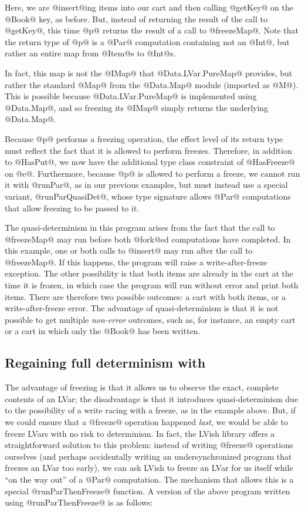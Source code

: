 Here, we are @insert@ing items into our cart and then calling @getKey@
on the @Book@ key, as before.  But, instead of returning the result of
the call to @getKey@, this time @p@ returns the result of a call to
@freezeMap@.  Note that the return type of @p@ is a @Par@ computation
containing not an @Int@, but rather an entire map from @Item@s to
@Int@s.

In fact, this map is not the @IMap@ that @Data.LVar.PureMap@ provides,
but rather the standard @Map@ from the @Data.Map@ module (imported as
@M@).  This is possible because @Data.LVar.PureMap@ is implemented
using @Data.Map@, and so freezing its @IMap@ simply returns the
underlying @Data.Map@.

Because @p@ performs a freezing operation, the effect level of its
return type must reflect the fact that it is allowed to perform
freezes.  Therefore, in addition to @HasPut@, we now have the
additional type class constraint of @HasFreeze@ on @e@.  Furthermore,
because @p@ is allowed to perform a freeze, we cannot run it with
@runPar@, as in our previous examples, but must instead use a special
variant, @runParQuasiDet@, whose type signature allows @Par@
computations that allow freezing to be passed to it.

The quasi-determinism in this program arises from the fact that the
call to @freezeMap@ may run before both @fork@ed computations have
completed.  In this example, one or both calls to @insert@ may run
after the call to @freezeMap@.  If this happens, the program will
raise a write-after-freeze exception.  The other possibility is that
both items are already in the cart at the time it is frozen, in which
case the program will run without error and print both items.  There
are therefore two possible outcomes: a cart with both items, or a
write-after-freeze error.  The advantage of quasi-determinism is that
it is not possible to get multiple \emph{non-error} outcomes, such as,
for instance, an empty cart or a cart in which only the @Book@ has
been written.

\subsection{Regaining full determinism with }\label{subsection:lvish-regaining-full-determinism-with-runparthenfreeze}

The advantage of freezing is that it allows us to observe the exact,
complete contents of an LVar; the disadvantage is that it introduces
quasi-determinism due to the possibility of a write racing with a
freeze, as in the example above.  But, if we could ensure that a
@freeze@ operation happened \emph{last}, we would be able to freeze
LVars with no risk to determinism.  In fact, the LVish library offers
a straightforward solution to this problem: instead of writing
@freeze@ operations ourselves (and perhaps accidentally writing an
undersynchronized program that freezes an LVar too early), we can ask
LVish to freeze an LVar for us itself while ``on the way out'' of a
@Par@ computation.  The mechanism that allows this is a special
@runParThenFreeze@ function.  A version of the above program written
using @runParThenFreeze@ is as follows:

